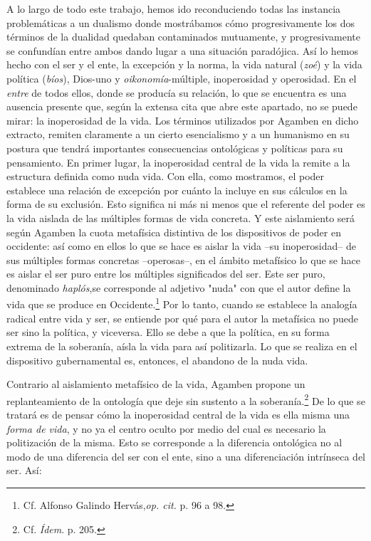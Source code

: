 \documentclass{book}
\begin{document}
A lo largo de todo este trabajo, hemos ido reconduciendo todas las
instancia problemáticas a un dualismo donde mostrábamos cómo
progresivamente los dos términos de la dualidad quedaban contaminados
mutuamente, y progresivamente se confundían entre ambos dando lugar a
una situación paradójica. Así lo hemos hecho con el ser y el ente, la
excepción y la norma, la vida natural (\emph{zoé}) y la vida política
(\emph{bíos}), Dios-uno y \emph{oikonomía}-múltiple, inoperosidad y
operosidad. En el \emph{entre} de todos ellos, donde se producía su
relación, lo que se encuentra es una ausencia presente que, según la
extensa cita que abre este apartado, no se puede mirar: la inoperosidad
de la vida. Los términos utilizados por Agamben en dicho extracto,
remiten claramente a un cierto esencialismo y a un humanismo en su
postura que tendrá importantes consecuencias ontológicas y políticas
para su pensamiento. En primer lugar, la inoperosidad central de la vida
la remite a la estructura definida como nuda vida. Con ella, como
mostramos, el poder establece una relación de excepción por cuánto la
incluye en sus cálculos en la forma de su exclusión. Esto significa ni
más ni menos que el referente del poder es la vida aislada de las
múltiples formas de vida concreta. Y este aislamiento será según Agamben
la cuota metafísica distintiva de los dispositivos de poder en
occidente: así como en ellos lo que se hace es aislar la vida --su
inoperosidad-- de sus múltiples formas concretas --operosas--, en el
ámbito metafísico lo que se hace es aislar el ser puro entre los
múltiples significados del ser. Este ser puro, denominado
\emph{haplós},se corresponde al adjetivo "nuda" con que el autor define
la vida que se produce en Occidente.\footnote{Cf. Alfonso Galindo
  Hervás,\emph{op. cit.} p. 96 a 98.} Por lo tanto, cuando se establece
la analogía radical entre vida y ser, se entiende por qué para el autor
la metafísica no puede ser sino la política, y viceversa. Ello se debe a
que la política, en su forma extrema de la soberanía, aísla la vida para
así politizarla. Lo que se realiza en el dispositivo gubernamental es,
entonces, el abandono de la nuda vida.

Contrario al aislamiento metafísico de la vida, Agamben propone un
replanteamiento de la ontología que deje sin sustento a la
soberanía.\footnote{Cf. \emph{Ídem}. p. 205.} De lo que se tratará es de
pensar cómo la inoperosidad central de la vida es ella misma una
\emph{forma de vida}, y no ya el centro oculto por medio del cual es
necesario la politización de la misma. Esto se corresponde a la
diferencia ontológica no al modo de una diferencia del ser con el ente,
sino a una diferenciación intrínseca del ser. Así:
\end{document}
